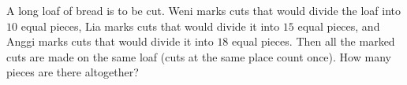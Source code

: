 A long loaf of bread is to be cut. Weni marks cuts that would divide the loaf into $10$ equal pieces, Lia marks cuts that would divide it into $15$ equal pieces, and Anggi marks cuts that would divide it into $18$ equal pieces. Then all the marked cuts are made on the same loaf (cuts at the same place count once). How many pieces are there altogether?
